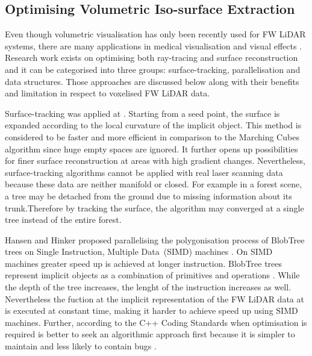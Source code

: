 \documentclass{subfiles}
\begin{document}
\subsection{Optimising Volumetric Iso-surface Extraction}
\par Even though volumetric visualisation has only been recently used for FW LiDAR systems, there are many applications in medical visualisation \cite{Levoy1998} \cite{Hadwiger2012} and visual effects \cite{Crassin2009} \cite{Laine2011SparseOctrees}. Research work exists on optimising both ray-tracing and surface reconstruction and it can be categorised into three groups: surface-tracking, parallelisation and data structures. Those approaches are discussed below along with their benefits and limitation in respect to voxelised FW LiDAR data.

\par Surface-tracking was applied at \cite{Rodrigues2005} \cite{Hartmann1998}. Starting from a seed point, the surface is expanded according to the local curvature of the implicit object. This method is considered to be faster and more efficient in comparison to the Marching Cubes algorithm since huge empty spaces are ignored. It further opens up possibilities for finer surface reconstruction at areas with high gradient changes. Nevertheless, surface-tracking algorithms cannot be applied with real laser scanning data because these data are neither manifold or closed. For example in a forest scene, a tree may be detached from the ground due to missing information about its trunk.Therefore by tracking the surface, the algorithm may converged at a single tree instead of the entire forest.  

\par Hansen and Hinker proposed parallelising the polygonisation process of BlobTree trees on Single Instruction, Multiple Data (SIMD) machines \cite{Hansen1992}. On SIMD machines greater speed up is achieved at longer instruction. BlobTree trees represent implicit objects as a combination of primitives and operations \cite{Galbraith2004}. While the depth of the tree increases, the lenght of the instruction increases as well. Nevertheless the fuction at the implicit representation of the FW LiDAR data at \cite{Miltiadou2014} is executed at constant time, making it harder to achieve speed up using SIMD machines. Further, according to the C++ Coding Standards when optimisation is required is better to seek an algorithmic approach first because it is simpler to maintain and less likely to contain bugs \cite{Sutter2004}. 
\end{document}
